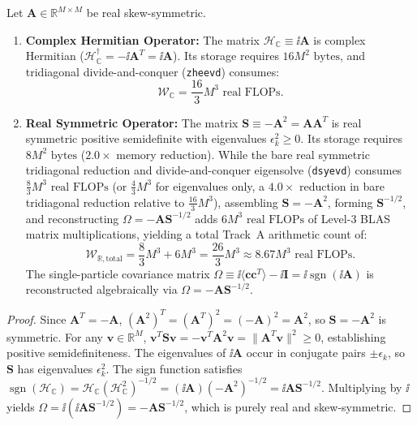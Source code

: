 \begin{theorem}
\label{thm:m1_8_real_vs_complex_algebra}
Let $\mathbf{A} \in \mathbb{R}^{M \times M}$ be real skew-symmetric.
\begin{enumerate}
\item \textbf{Complex Hermitian Operator:} The matrix $\mathcal{H}_{\mathbb{C}} \equiv \ii \mathbf{A}$ is complex Hermitian ($\mathcal{H}_{\mathbb{C}}^\dagger = -\ii \mathbf{A}^T = \ii \mathbf{A}$). Its storage requires $16 M^2 \text{ bytes}$, and tridiagonal divide-and-conquer (\texttt{zheevd}) consumes:
\begin{equation}
\label{eq:m1_8_complex_flops}
\mathcal{W}_{\mathbb{C}} = \frac{16}{3} M^3 \text{ real FLOPs}.
\end{equation}
\item \textbf{Real Symmetric Operator:} The matrix $\mathbf{S} \equiv -\mathbf{A}^2 = \mathbf{A} \mathbf{A}^T$ is real symmetric positive semidefinite with eigenvalues $\epsilon_k^2 \ge 0$. Its storage requires $8 M^2 \text{ bytes}$ ($2.0\times$ memory reduction). While the bare real symmetric tridiagonal reduction and divide-and-conquer eigensolve (\texttt{dsyevd}) consumes $\frac{8}{3} M^3 \text{ real FLOPs}$ (or $\frac{4}{3} M^3$ for eigenvalues only, a $4.0\times$ reduction in bare tridiagonal reduction relative to $\frac{16}{3} M^3$), assembling $\mathbf{S} = -\mathbf{A}^2$, forming $\mathbf{S}^{-1/2}$, and reconstructing $\Omega = -\mathbf{A} \mathbf{S}^{-1/2}$ adds $6 M^3 \text{ real FLOPs}$ of Level-3 BLAS matrix multiplications, yielding a total Track~A arithmetic count of:
\begin{equation}
\label{eq:m1_8_real_flops}
\mathcal{W}_{\mathbb{R},\text{total}} = \frac{8}{3} M^3 + 6 M^3 = \frac{26}{3} M^3 \approx 8.67 M^3 \text{ real FLOPs}.
\end{equation}
The single-particle covariance matrix $\Omega \equiv \ii \langle \mathbf{c} \mathbf{c}^T \rangle - \ii \mathbf{I} = \ii \operatorname{sgn}(\ii \mathbf{A})$ is reconstructed algebraically via $\Omega = -\mathbf{A} \mathbf{S}^{-1/2}$.
\end{enumerate}
\end{theorem}
\begin{proof}
Since $\mathbf{A}^T = -\mathbf{A}$, $(\mathbf{A}^2)^T = (\mathbf{A}^T)^2 = (-\mathbf{A})^2 = \mathbf{A}^2$, so $\mathbf{S} = -\mathbf{A}^2$ is symmetric. For any $\mathbf{v} \in \mathbb{R}^M$, $\mathbf{v}^T \mathbf{S} \mathbf{v} = - \mathbf{v}^T \mathbf{A}^2 \mathbf{v} = \|\mathbf{A}^T \mathbf{v}\|^2 \ge 0$, establishing positive semidefiniteness. The eigenvalues of $\ii \mathbf{A}$ occur in conjugate pairs $\pm \epsilon_k$, so $\mathbf{S}$ has eigenvalues $\epsilon_k^2$. The sign function satisfies $\operatorname{sgn}(\mathcal{H}_{\mathbb{C}}) = \mathcal{H}_{\mathbb{C}} (\mathcal{H}_{\mathbb{C}}^2)^{-1/2} = (\ii \mathbf{A}) (-\mathbf{A}^2)^{-1/2} = \ii \mathbf{A} \mathbf{S}^{-1/2}$. Multiplying by $\ii$ yields $\Omega = \ii (\ii \mathbf{A} \mathbf{S}^{-1/2}) = -\mathbf{A} \mathbf{S}^{-1/2}$, which is purely real and skew-symmetric.
\end{proof}

